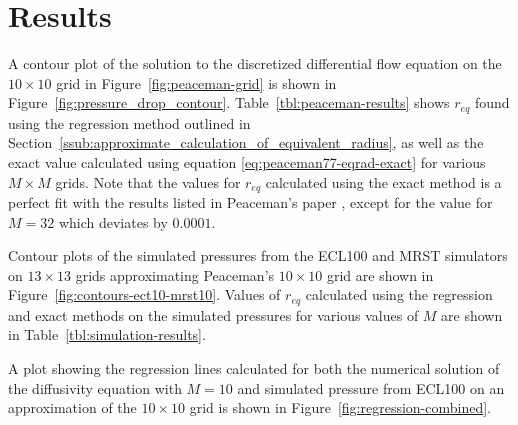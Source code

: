 
\section{Results} %
\label{sec:results}
A contour plot of the solution to the discretized differential flow equation on the $10 \times 10$ grid in Figure~\ref{fig:peaceman-grid} is shown in Figure~\ref{fig:pressure_drop_contour}. Table~\ref{tbl:peaceman-results} shows $r_{eq}$ found using the regression method outlined in Section~\ref{ssub:approximate_calculation_of_equivalent_radius}, as well as the exact value calculated using equation \eqref{eq:peaceman77-eqrad-exact} for various $M\times M$ grids. Note that the values for $r_{eq}$ calculated using the exact method is a perfect fit with the results listed in Peaceman's paper \cite{Peaceman1978Interpretation}, except for the value for $M=32$ which deviates by $0.0001$.

Contour plots of the simulated pressures from the ECL100 and MRST simulators on $13\times 13$ grids approximating Peaceman's $10\times 10$ grid are shown in Figure~\ref{fig:contours-ect10-mrst10}. Values of $r_{eq}$ calculated using the regression and exact methods on the simulated pressures for various values of $M$ are shown in Table~\ref{tbl:simulation-results}.

A plot showing the regression lines calculated for both the numerical solution of the diffusivity equation with $M=10$ and simulated pressure from ECL100 on an approximation of the $10\times 10$ grid is shown in Figure~\ref{fig:regression-combined}.



